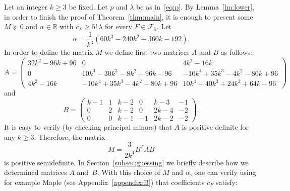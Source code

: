 \documentclass[12pt]{article}
\theoremstyle{definition}
\theoremstyle{remark}
\newcommand{\I}[1]{{\mathbb #1}}
\renewcommand{\ge}{\geqslant}
\renewcommand{\geq}{\geqslant}
\renewcommand{\succeq}{\succcurlyeq}
\begin{document}
Let an integer $k \geq 3$ be fixed. Let $p$ and $\lambda$ be as in~\eqref{eq:p}.
By Lemma~\ref{lm:lower}, in order to finish the proof of Theorem~\ref{thm:main}, it is enough to present some $M\succeq 0$  and $\alpha\in\I R$ with $c_F \ge 5!\,\lambda$ for every $F \in \mathcal{F}_5$.
Let 
\[
 \alpha=\frac{1}{k^3}\left(60k^3 - 240k^2 + 360k - 192\right).
\]
In order to define the matrix $M$ we define first two matrices $A$ and $B$ as follows:
\[
A = 
\begin{pmatrix}
             32k^2 - 96k + 96    &                                 0                          & 4k^2 - 16k\\
                                   0              &  10k^4 - 30k^3 - 8k^2 + 96k - 96   &-10k^4 + 35k^3 - 4k^2 - 80k + 96\\
                         4k^2 - 16k          & -10k^4 + 35k^3 - 4k^2 - 80k + 96  &10k^4 - 40k^3 + 24k^2 + 64k - 96
\end{pmatrix}
\]
and 
\[
B=
\begin{pmatrix}
  k - 1   &    1  & k - 2   &    0  &    k - 3  &    -1\\
      0    &    2  & k - 2   &    0  &  2k - 4  &    -2\\
      0    &    0  & k - 1   &   -1  &  2k - 2  &    -2
\end{pmatrix}.
\]
It is easy to verify (by checking principal minors) that $A$ is positive definite for any $k \geq 3$. Therefore, the matrix
\begin{equation}\label{eq:BAB}
M = \frac{3}{2k^4} B^T A B
\end{equation}
is positive semidefinite. In Section~\ref{subsec:guessing} we briefly describe how we determined matrices $A$ and~$B$.
With this choice of $M$ and $\alpha$, one can verify using for example Maple (see Appendix~\ref{appendix:B}) that coefficients $c_F$ satisfy:
\end{document}
